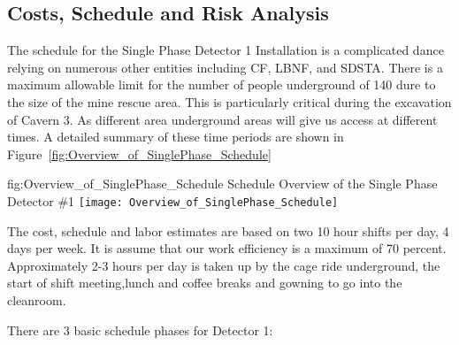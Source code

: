 \subsection{Costs, Schedule and Risk Analysis}
\label{sec:fdsp-tc-inst-cost}



The schedule for the Single Phase Detector 1 Installation is a complicated dance relying on numerous other entities including CF, LBNF, and SDSTA.  There is a maximum allowable limit for the number of people underground of 140 dure to the size of the mine rescue area.  This is particularly critical during the excavation of Cavern 3. As different area underground areas will give us access at different times. A detailed summary of these time periods are shown in Figure~\ref{fig:Overview_of_SinglePhase_Schedule}



\begin{dunefigure}
{fig:Overview_of_SinglePhase_Schedule}
{Schedule Overview of the Single Phase Detector \#1}                
\texttt{[image: Overview\_of\_SinglePhase\_Schedule]}
\end{dunefigure}

The cost, schedule and labor estimates are based on two 10 hour shifts per day, 4 days per week. It is assume that our work efficiency is a maximum of 70 percent.  Approximately 2-3 hours per day is taken up by the cage ride underground, the start of shift meeting,lunch and coffee breaks and gowning to go into the cleanroom. 

There are 3 basic schedule phases for Detector 1:

